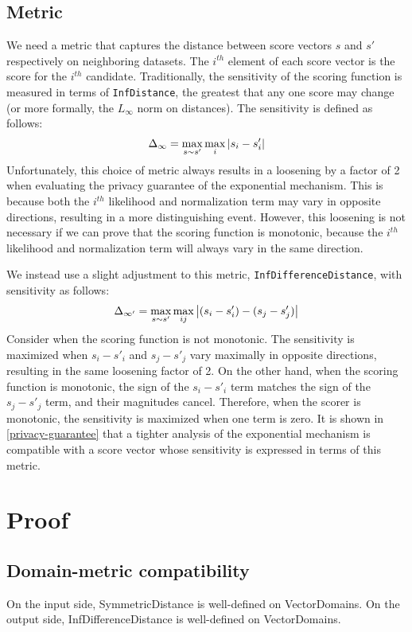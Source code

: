 \documentclass{article}
\begin{document}
\subsection{Metric}
We need a metric that captures the distance between score vectors $s$ and $s'$ respectively on neighboring datasets. 
The $i^{th}$ element of each score vector is the score for the $i^{th}$ candidate.
Traditionally, the sensitivity of the scoring function is measured in terms of \texttt{InfDistance}, 
the greatest that any one score may change (or more formally, the $L_\infty$ norm on distances).
The sensitivity is defined as follows:
\begin{equation}
    \Delta_{\infty} = \max\limits_{s \sim s'} \max\limits_{i} \abs{s_i - s'_i}
\end{equation}
Unfortunately, this choice of metric always results in a loosening by a factor of 2 when evaluating the privacy guarantee of the exponential mechanism.
This is because both the $i^{th}$ likelihood and normalization term may vary in opposite directions, resulting in a more distinguishing event.
However, this loosening is not necessary if we can prove that the scoring function is monotonic, because the $i^{th}$ likelihood and normalization term will always vary in the same direction.

We instead use a slight adjustment to this metric, \texttt{InfDifferenceDistance}, with sensitivity as follows:
\begin{equation}
    \Delta_{\infty'} = \max\limits_{s \sim s'} \max\limits_{ij} \abs{(s_i - s'_i) - (s_j - s'_j)}
\end{equation}
Consider when the scoring function is not monotonic.
The sensitivity is maximized when $s_i - s'_i$ and $s_j - s'_j$ vary maximally in opposite directions, resulting in the same loosening factor of 2.
On the other hand, when the scoring function is monotonic, the sign of the $s_i - s'_i$ term matches the sign of the $s_j - s'_j$ term,
and their magnitudes cancel.
Therefore, when the scorer is monotonic, the sensitivity is maximized when one term is zero. 
It is shown in \ref{privacy-guarantee} that a tighter analysis of the exponential mechanism is compatible with a score vector whose sensitivity is expressed in terms of this metric.

\section{Proof}
\subsection{Domain-metric compatibility}
On the input side, SymmetricDistance is well-defined on VectorDomains. 
On the output side, InfDifferenceDistance is well-defined on VectorDomains.
\end{document}
